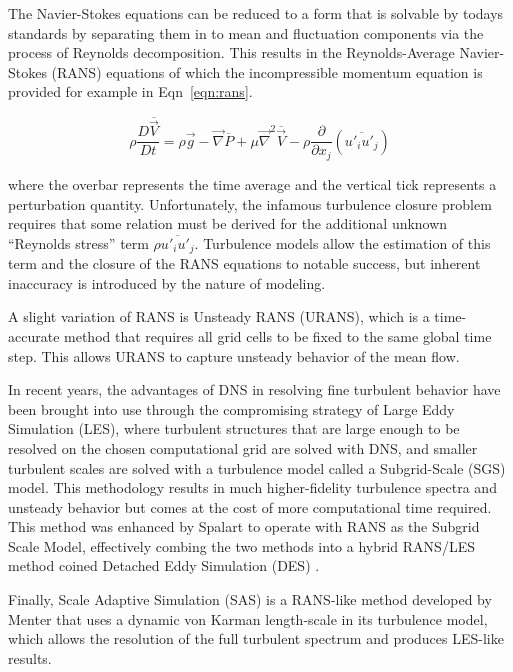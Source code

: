 \documentclass[journal]{new-aiaa}
\begin{document}
The Navier-Stokes equations can be reduced to a form that is solvable by todays standards by separating them in to mean and fluctuation components via the process of Reynolds decomposition. This results in the Reynolds-Average Navier-Stokes (RANS) equations of which the incompressible momentum equation is provided for example in Eqn~\ref{eqn:rans}.



\begin{equation}
\label{eqn:rans}
\rho \dfrac{D \overline{\vec{V}}}{D t}
    = \rho\vec{g} - \vec{\nabla} \overline{P}
    + \mu \vec{\nabla}^2 \overline{\vec{V}}
    - \rho \dfrac{\partial}{\partial x_j} \left( \overline{u'_i u'_j} \right)
\end{equation}

\noindent where the overbar represents the time average and the vertical tick represents a perturbation quantity. Unfortunately, the infamous turbulence closure problem requires that some relation must be derived for the additional unknown ``Reynolds stress'' term $\rho \overline{u'_i u'_j}$. Turbulence models allow the estimation of this term and the closure of the RANS equations to notable success, but inherent inaccuracy is introduced by the nature of modeling.

A slight variation of RANS is Unsteady RANS (URANS), which is a time-accurate method that requires all grid cells to be fixed to the same global time step.  This allows URANS to capture unsteady behavior of the mean flow.

In recent years, the advantages of DNS in resolving fine turbulent behavior have been brought into use through the compromising strategy of Large Eddy Simulation (LES), where turbulent structures that are large enough to be resolved on the chosen computational grid are solved with DNS, and smaller turbulent scales are solved with a turbulence model called a Subgrid-Scale (SGS) model. This methodology results in much higher-fidelity turbulence spectra and unsteady behavior but comes at the cost of more computational time required. This method was enhanced by Spalart to operate with RANS as the Subgrid Scale Model, effectively combing the two methods into a hybrid RANS/LES method coined Detached Eddy Simulation (DES) \cite{spalart2009detachededdy}.

Finally, Scale Adaptive Simulation (SAS) is a RANS-like method developed by Menter \cite{menter2005scaleadaptive} that uses a dynamic von Karman length-scale in its turbulence model, which allows the resolution of the full turbulent spectrum and produces LES-like results.
\end{document}

